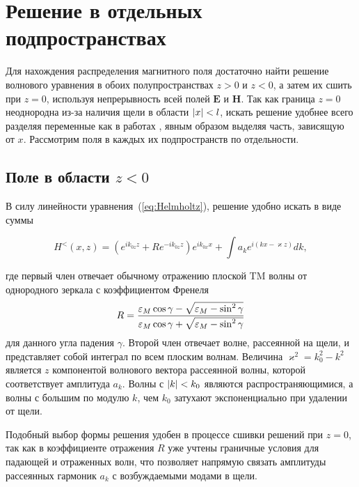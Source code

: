 \section{Решение в отдельных подпространствах}
 Для нахождения распределения магнитного поля достаточно найти решение волнового уравнения в обоих полупространствах $z>0$ и $z<0$, а затем их сшить при $z = 0$, используя непрерывность всей полей $\mathbf{E}$ и $\mathbf{H}$. Так как граница $z=0$ неоднородна из-за наличия щели в области
 $\lvert x\rvert < l$, искать решение удобнее всего разделяя переменные как в работах \cite{sturman2010transmission,gorkunov2011transmission}, 
 явным образом выделяя часть, 
 зависящую от $x$. Рассмотрим поля в каждых их подпространств по отдельности.

 \subsection{Поле в области $z < 0$}
В силу линейности уравнения~(\ref{eq:Helmholtz}), решение удобно искать в виде суммы

\begin{equation}
  H^<(x,z) = (e^{i k_{0z} z} + R e^{-i k_{0z} z}) e^{i k_{0x} x} + \int a_k e^{i (k x - \varkappa z)} dk, 
\end{equation}

где первый член отвечает обычному отражению плоской TM волны от однородного зеркала с коэффициентом Френеля 
\[
 R = \frac{\varepsilon_M \cos{\gamma} - \sqrt{\varepsilon_M - \sin^2{\gamma}}}{\varepsilon_M \cos{\gamma} + \sqrt{\varepsilon_M - \sin^2{\gamma}}}
\]
для данного угла падения $\gamma$.  
Второй член отвечает волне, рассеянной на щели, и представляет собой интеграл по всем плоским волнам. Величина $\varkappa^2 = k_0^2-k^2$ является
$z$ компонентой волнового вектора рассеянной волны, которой соответствует амплитуда $a_k$. Волны с $\lvert k\rvert < k_0$ являются распространяющимися,
а волны с большим по модулю $k$, чем $k_0$ затухают экспоненциально при удалении от щели. 

Подобный выбор формы решения удобен в процессе сшивки решений при $z = 0$, так как в коэффициенте отражения $R$ уже учтены граничные условия для падающей и отраженных волн, что позволяет напрямую связать амплитуды рассеянных гармоник $a_k$ с возбуждаемыми модами в щели. 

